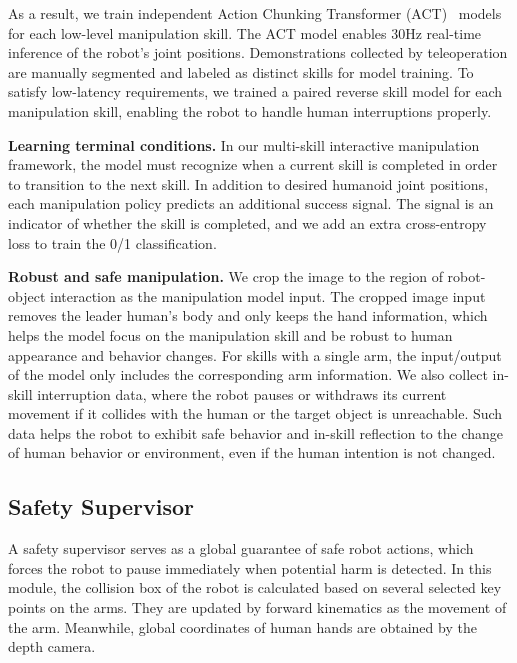 As a result, we train independent Action Chunking Transformer (ACT)~\citep{zhao2023learning} models for each low-level manipulation skill. 
The ACT model enables 30Hz real-time inference of the robot's joint positions.
Demonstrations collected by teleoperation are manually segmented and labeled as distinct skills for model training.
To satisfy low-latency requirements, we trained a paired reverse skill model for each manipulation skill, enabling the robot to handle human interruptions properly.

\noindent\textbf{Learning terminal conditions.}
In our multi-skill interactive manipulation framework, the model must recognize when a current skill is completed in order to transition to the next skill. 
In addition to desired humanoid joint positions, each manipulation policy predicts an additional success signal. The signal is an indicator of whether the skill is completed, and we add an extra cross-entropy loss to train the 0/1 classification.

\noindent\textbf{Robust and safe manipulation.}
We crop the image to the region of robot-object interaction as the manipulation model input. The cropped image input removes the leader human's body and only keeps the hand information, which helps the model focus on the manipulation skill and be robust to human appearance and behavior changes.
For skills with a single arm, the input/output of the model only includes the corresponding arm information.
We also collect in-skill interruption data, where the robot pauses or withdraws its current movement if it collides with the human or the target object is unreachable.
Such data helps the robot to exhibit safe behavior and in-skill reflection to the change of human behavior or environment, even if the human intention is not changed.

\subsection{Safety Supervisor}

A safety supervisor serves as a global guarantee of safe robot actions, which forces the robot to pause immediately when potential harm is detected.
In this module, the collision box of the robot is calculated based on several selected key points on the arms.
They are updated by forward kinematics as the movement of the arm.
Meanwhile, global coordinates of human hands are obtained by the depth camera.

